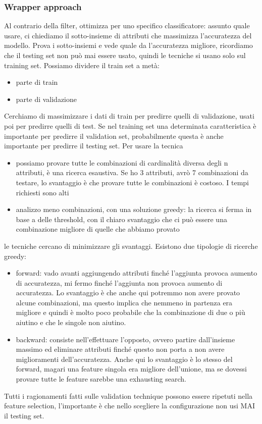 \documentclass{article}
\begin{document}
\subsubsection{Wrapper approach}
Al contrario della filter, ottimizza per uno specifico classificatore: assunto quale usare, ci chiediamo il sotto-insieme di attributi che massimizza l'accuratezza del modello. Prova i sotto-insiemi e vede quale da l'accuratezza migliore, ricordiamo che il testing set non può mai essere usato, quindi le tecniche si usano solo sul training set. Possiamo dividere il train set a metà:
\begin{itemize}
\item parte di train
\item parte di validazione
\end{itemize}
Cerchiamo di massimizzare i dati di train per predirre quelli di validazione, usati poi per predirre quelli di test. Se nel training set una determinata caratteristica è importante per predirre il validation set, probabilmente questa è anche importante per predirre il testing set. Per usare la tecnica
\begin{itemize}
\item possiamo provare tutte le combinazioni di cardinalità diversa degli n attributi, è una ricerca esaustiva. Se ho 3 attributi, avrò 7 combinazioni da testare, lo svantaggio è che provare tutte le combinazioni è costoso. I tempi richiesti sono alti
\item analizzo meno combinazioni, con una soluzione greedy: la ricerca si ferma in base a delle threshold, con il chiaro svantaggio che ci può essere una combinazione migliore di quelle che abbiamo provato
\end{itemize}
le tecniche cercano di minimizzare gli svantaggi. Esistono due tipologie di ricerche greedy:
\begin{itemize}
\item forward: vado avanti aggiungendo attributi finché l'aggiunta provoca aumento di accuratezza, mi fermo finché l'aggiunta non provoca aumento di accuratezza. Lo svantaggio è che anche qui potremmo non avere provato alcune combinazioni, ma questo implica che nemmeno in partenza era migliore e quindi è molto poco probabile che la combinazione di due o più aiutino e che le singole non aiutino.
\item backward: consiste nell'effettuare l'opposto, ovvero partire dall'insieme massimo ed eliminare attributi finché questo non porta a non avere miglioramenti dell'accuratezza. Anche qui lo svantaggio è lo stesso del forward, magari una feature singola era migliore dell'unione, ma se dovessi provare tutte le feature sarebbe una exhausting search.
\end{itemize}
Tutti i ragionamenti fatti sulle validation technique possono essere ripetuti nella feature selection, l'importante è che nello scegliere la configurazione non usi MAI il testing set.
\end{document}
